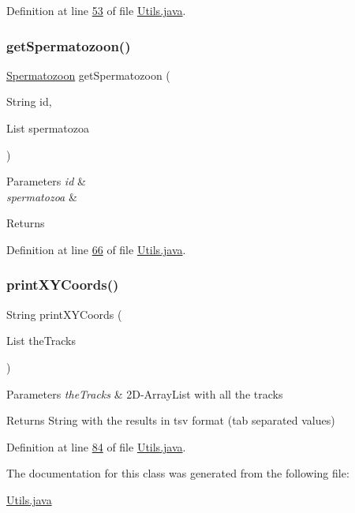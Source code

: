 Definition at line \hyperlink{_utils_8java_source_l00053}{53} of file \hyperlink{_utils_8java_source}{Utils.\+java}.

\hypertarget{classfunctions_1_1_utils_a3af2ec0eae0c2c19f7332e34197999bf}{}\label{classfunctions_1_1_utils_a3af2ec0eae0c2c19f7332e34197999bf} 
\subsubsection{\texorpdfstring{get\+Spermatozoon()}{getSpermatozoon()}}
{\footnotesize\ttfamily \hyperlink{classdata_1_1_spermatozoon}{Spermatozoon} get\+Spermatozoon (\begin{DoxyParamCaption}\item[{String}]{id,  }\item[{List}]{spermatozoa }\end{DoxyParamCaption})}


\begin{DoxyParams}{Parameters}
{\em id} & \\
\hline
{\em spermatozoa} & \\
\hline
\end{DoxyParams}
\begin{DoxyReturn}{Returns}

\end{DoxyReturn}


Definition at line \hyperlink{_utils_8java_source_l00066}{66} of file \hyperlink{_utils_8java_source}{Utils.\+java}.

\hypertarget{classfunctions_1_1_utils_ab85218da3569b5a7c0b9749e7b2b747a}{}\label{classfunctions_1_1_utils_ab85218da3569b5a7c0b9749e7b2b747a} 
\subsubsection{\texorpdfstring{print\+X\+Y\+Coords()}{printXYCoords()}}
{\footnotesize\ttfamily String print\+X\+Y\+Coords (\begin{DoxyParamCaption}\item[{List}]{the\+Tracks }\end{DoxyParamCaption})}


\begin{DoxyParams}{Parameters}
{\em the\+Tracks} & 2\+D-\/\+Array\+List with all the tracks \\
\hline
\end{DoxyParams}
\begin{DoxyReturn}{Returns}
String with the results in tsv format (tab separated values) 
\end{DoxyReturn}


Definition at line \hyperlink{_utils_8java_source_l00084}{84} of file \hyperlink{_utils_8java_source}{Utils.\+java}.



The documentation for this class was generated from the following file\+:\begin{DoxyCompactItemize}
\item 
\hyperlink{_utils_8java}{Utils.\+java}\end{DoxyCompactItemize}
